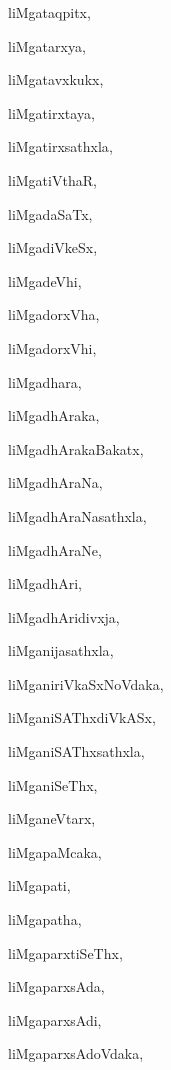 \begin{multicols}{2}
{liMgataqpitx}, \pageref{liMgataqpitx}

{liMgatarxya}, \pageref{liMgatarxya}

{liMgatavxkukx}, \pageref{liMgatavxkukx}

{liMgatirxtaya}, \pageref{liMgatirxtaya}

{liMgatirxsathxla}, \pageref{liMgatirxsathxla}

{liMgatiVthaR}, \pageref{liMgatiVthaR}

{liMgadaSaTx}, \pageref{liMgadaSaTx}

{liMgadiVkeSx}, \pageref{liMgadiVkeSx}

{liMgadeVhi}, \pageref{liMgadeVhi}

{liMgadorxVha}, \pageref{liMgadorxVha}

{liMgadorxVhi}, \pageref{liMgadorxVhi}

{liMgadhara}, \pageref{liMgadhara}

{liMgadhAraka}, \pageref{liMgadhAraka}

{liMgadhArakaBakatx}, \pageref{liMgadhArakaBakatx}

{liMgadhAraNa}, \pageref{liMgadhAraNa}

{liMgadhAraNasathxla}, \pageref{liMgadhAraNasathxla}

{liMgadhAraNe}, \pageref{liMgadhAraNe}

{liMgadhAri}, \pageref{liMgadhAri}

{liMgadhAridivxja}, \pageref{liMgadhAridivxja}

{liMganijasathxla}, \pageref{liMganijasathxla}

{liMganiriVkaSxNoVdaka}, \pageref{liMganiriVkaSxNoVdaka}

{liMganiSAThxdiVkASx}, \pageref{liMganiSAThxdiVkASx}

{liMganiSAThxsathxla}, \pageref{liMganiSAThxsathxla}

{liMganiSeThx}, \pageref{liMganiSeThx}

{liMganeVtarx}, \pageref{liMganeVtarx}

{liMgapaMcaka}, \pageref{liMgapaMcaka}

{liMgapati}, \pageref{liMgapati}

{liMgapatha}, \pageref{liMgapatha}

{liMgaparxtiSeThx}, \pageref{liMgaparxtiSeThx}

{liMgaparxsAda}, \pageref{liMgaparxsAda}

{liMgaparxsAdi}, \pageref{liMgaparxsAdi}

{liMgaparxsAdoVdaka}, \pageref{liMgaparxsAdoVdaka}


\end{multicols}
